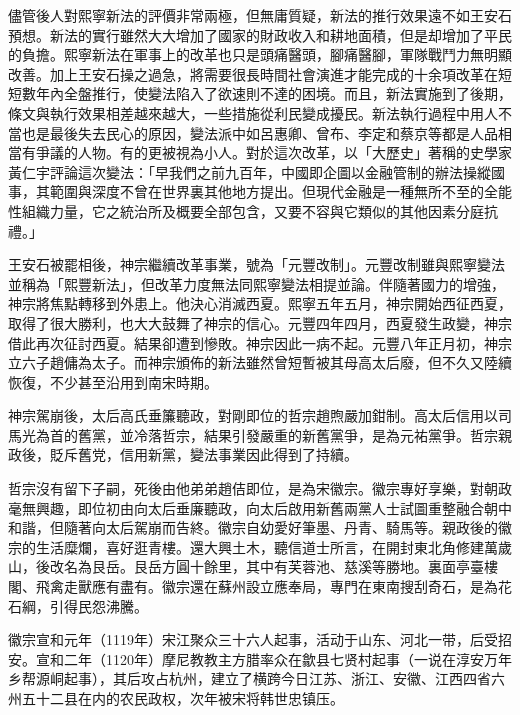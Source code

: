 儘管後人對熙寧新法的評價非常兩極，但無庸質疑，新法的推行效果遠不如王安石預想。新法的實行雖然大大增加了國家的財政收入和耕地面積，但是却增加了平民的負擔。熙寧新法在軍事上的改革也只是頭痛醫頭，腳痛醫腳，軍隊戰鬥力無明顯改善。加上王安石操之過急，將需要很長時間社會演進才能完成的十余項改革在短短數年內全盤推行，使變法陷入了欲速則不達的困境。而且，新法實施到了後期，條文與執行效果相差越來越大，一些措施從利民變成擾民。新法執行過程中用人不當也是最後失去民心的原因，變法派中如呂惠卿、曾布、李定和蔡京等都是人品相當有爭議的人物。有的更被視為小人。對於這次改革，以「大歷史」著稱的史學家黃仁宇評論這次變法：「早我們之前九百年，中國即企圖以金融管制的辦法操縱國事，其範圍與深度不曾在世界裏其他地方提出。但現代金融是一種無所不至的全能性組織力量，它之統治所及概要全部包含，又要不容與它類似的其他因素分庭抗禮。」

王安石被罷相後，神宗繼續改革事業，號為「元豐改制」。元豐改制雖與熙寧變法並稱為「熙豐新法」，但改革力度無法同熙寧變法相提並論。伴隨著國力的增強，神宗將焦點轉移到外患上。他決心消滅西夏。熙寧五年五月，神宗開始西征西夏，取得了很大勝利，也大大鼓舞了神宗的信心。元豐四年四月，西夏發生政變，神宗借此再次征討西夏。結果卻遭到慘敗。神宗因此一病不起。元豐八年正月初，神宗立六子趙傭為太子。而神宗頒佈的新法雖然曾短暫被其母高太后廢，但不久又陸續恢復，不少甚至沿用到南宋時期。

神宗駕崩後，太后高氏垂簾聽政，對剛即位的哲宗趙煦嚴加鉗制。高太后信用以司馬光為首的舊黨，並冷落哲宗，結果引發嚴重的新舊黨爭，是為元祐黨爭。哲宗親政後，貶斥舊党，信用新黨，變法事業因此得到了持續。

哲宗沒有留下子嗣，死後由他弟弟趙佶即位，是為宋徽宗。徽宗專好享樂，對朝政毫無興趣，即位初由向太后垂廉聽政，向太后啟用新舊兩黨人士試圖重整融合朝中和諧，但隨著向太后駕崩而告終。徽宗自幼愛好筆墨、丹青、騎馬等。親政後的徽宗的生活糜爛，喜好逛青樓。還大興土木，聽信道士所言，在開封東北角修建萬歲山，後改名為艮岳。艮岳方圓十餘里，其中有芙蓉池、慈溪等勝地。裏面亭臺樓閣、飛禽走獸應有盡有。徽宗還在蘇州設立應奉局，專門在東南搜刮奇石，是為花石綱，引得民怨沸騰。

徽宗宣和元年（1119年）宋江聚众三十六人起事，活动于山东、河北一带，后受招安。宣和二年（1120年）摩尼教教主方腊率众在歙县七贤村起事（一说在淳安万年乡帮源峒起事），其后攻占杭州，建立了横跨今日江苏、浙江、安徽、江西四省六州五十二县在内的农民政权，次年被宋将韩世忠镇压。


